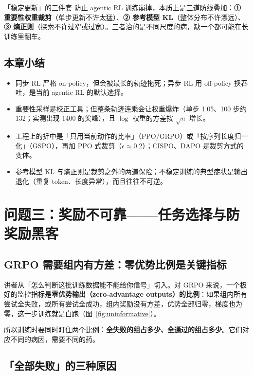\documentclass[a4paper]{article}
\begin{document}
\begin{importantbox}{「稳定更新」的三件套}
防止 agentic RL 训练崩掉，本质上是三道防线叠加：\textbf{① 重要性权重裁剪}（单步更新不许太猛）、\textbf{② 参考模型 KL}（整体分布不许漂远）、\textbf{③ 熵正则}（探索不许过窄或过宽）。三者治的是不同尺度的病，缺一个都可能在长训练里翻车。
\end{importantbox}

\subsection{本章小结}

\begin{itemize}
\item 同步 RL 严格 on-policy，但会被最长的轨迹拖死；异步 RL 用 off-policy 换吞吐，是当前 agentic RL 的默认选择。
\item 重要性采样是校正工具；但整条轨迹连乘会让权重爆炸（单步 1.05、100 步约 132；实测出现 1400 的尖峰），且 $\log$ 权重的方差按 $\sqrt{n}$ 增长。
\item 工程上的折中是「只用当前动作的比率」（PPO/GRPO）或「按序列长度归一化」（GSPO），再加 PPO 式裁剪（$\epsilon\approx0.2$）；CISPO、DAPO 是裁剪方式的变体。
\item 参考模型 KL 与熵正则是裁剪之外的两道保险；不稳定训练的典型症状是输出退化（重复 token、长度异常），而且往往不可逆。
\end{itemize}

\section{问题三：奖励不可靠——任务选择与防奖励黑客}

\subsection{GRPO 需要组内有方差：零优势比例是关键指标}

讲者从「怎么判断这批训练数据能不能给你信号」切入。对 GRPO 来说，一个极好的监控指标是\textbf{零优势输出（zero-advantage outputs）的比例}：如果组内所有尝试全失败，或所有尝试全成功，组内奖励没有方差，优势全部归零，梯度也为零，这一步训练就是白跑（图~\ref{fig:uninformative}）。

所以训练时要同时盯住两个比例：\textbf{全失败的组占多少、全通过的组占多少}。它们对应不同的病因，需要不同的药。

\subsection{「全部失败」的三种原因}
\end{document}
